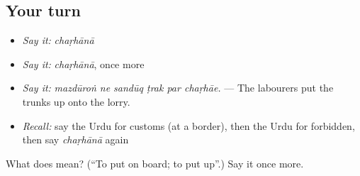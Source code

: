\subsection*{Your turn}
\begin{itemize}
\raggedright
  \item \emph{Say it:} \emph{chaṛhānā}
  \item \emph{Say it:} \emph{chaṛhānā}, once more
  \item \emph{Say it:} \emph{mazdūroṅ ne sandūq ṭrak par chaṛhāe.} — The labourers put the trunks up onto the lorry.
  \item \emph{Recall:} say the Urdu for customs (at a border), then the Urdu for forbidden, then say \emph{chaṛhānā} again
\end{itemize}

\begin{tcolorbox}[breakable,colback=teal!4,colframe=teal!35!black,title={Before you move on}]
What does  mean? (\textquotedblleft{}To put on board; to put up\textquotedblright{}.) Say it once more.
\end{tcolorbox}
